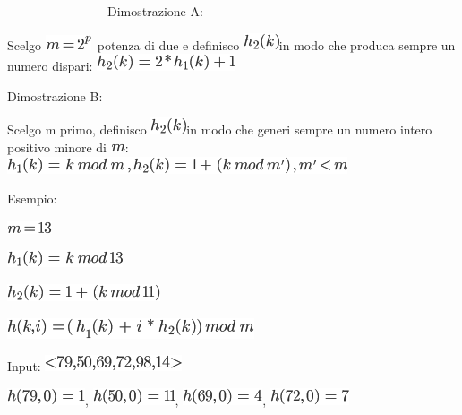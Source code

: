 \documentclass{article}
\begin{document}
{~~~~~~~~~~~~~~~~}{Dimostrazione A}{:}

{Scelgo }\includegraphics{images/image303.png}{~potenza di due e
definisco }\includegraphics{images/image299.png}{in modo che produca
sempre un numero dispari: }\includegraphics{images/image304.png}

{Dimostrazione B}{:}

{Scelgo m primo, definisco }\includegraphics{images/image299.png}{in
modo che generi sempre un numero intero positivo minore di
}\includegraphics{images/image235.png}{:
}\includegraphics{images/image305.png}

{Esempio:}

\includegraphics{images/image306.png}

\includegraphics{images/image307.png}

\includegraphics{images/image308.png}

\includegraphics{images/image309.png}{~}

{}

{Input: }\includegraphics{images/image310.png}

{}

\includegraphics{images/image311.png}{,
}\includegraphics{images/image312.png}{,
}\includegraphics{images/image313.png}{,
}\includegraphics{images/image314.png}
\end{document}
